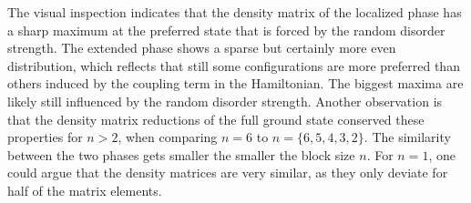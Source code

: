 \documentclass[reprint,amsmath,amssymb,aps,prb]{revtex4-2}
\begin{document}
%

The visual inspection indicates that the density matrix of the localized phase has a sharp maximum at the preferred state that is forced by the random disorder strength. The extended phase shows a sparse but certainly more even distribution, which reflects that still some configurations are more preferred than others induced by the coupling term in the Hamiltonian. The biggest maxima are likely still influenced by the random disorder strength. Another observation is that the density matrix reductions of the full ground state conserved these properties for $n>2$, when comparing $n=6$ to $n=\{6,5,4,3,2\}$. The similarity between the two phases gets smaller the smaller the block size $n$. For $n=1$, one could argue that the density matrices are very similar, as they only deviate for half of the matrix elements.
\end{document}
